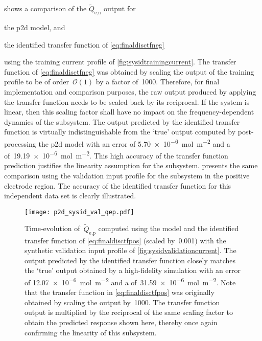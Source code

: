  shows a comparison of the $\widetilde{Q}_{\text{e,n}}$
output for
\begin{enumerate*}[label=\emph{\alph*})]
    \item the \gls{p2d} model, and
    \item the identified transfer function of \cref{eq:finaldisctfneg}
\end{enumerate*}
using  the  training  current  profile  of \cref{fig:sysidtrainingcurrent}.  The
transfer function of \cref{eq:finaldisctfneg} was obtained by scaling the output
of the  training profile to  be of order~$\mathcal{O}(1)$  by a factor  of~1000.
Therefore,  for final  implementation and  comparison purposes,  the raw  output
produced  by applying  the transfer  function  needs to  be scaled  back by  its
reciprocal. If  the system  is linear,  then this scaling  factor shall  have no
impact  on  the  frequency-dependent  dynamics  of  the  subsystem.  The  output
predicted  by the  identified transfer  function is  virtually indistinguishable
from  the `true'  output computed  by post-processing  the \gls{p2d}  model with
an    error   of  \SI{5.70e-6}{\mole\per\meter\squared}  and  a
 of~\SI{19.19e-6}{\mole\per\meter\squared}.  This high accuracy
of the transfer  function prediction justifies the linearity  assumption for the
subsystem.    presents  the  same  comparison  using  the
validation input profile for the subsystem in the positive electrode region. The
accuracy of  the identified transfer function  for this independent data  set is
clearly illustrated.

\begin{figure}[!htbp]
    \centering
    \texttt{[image: p2d\_sysid\_val\_qep.pdf]}
    \caption[$\widetilde{Q}_{\text{e,p}}(t)$ outputs from  and
    identified transfer function for training profile]{%
        Time-evolution of~$\widetilde{Q}_{\text{e,p}}$ computed using the
         model  and the identified transfer function
        of \cref{eq:finaldisctfpos} (scaled by~0.001) with the synthetic
        validation input profile of \cref{fig:sysidvalidationcurrent}. The output
        predicted by the identified transfer function closely matches the `true'
        output obtained by a high-fidelity  simulation with an
         error of \SI{12.07e-6}{\mole\per\meter\squared} and a
         of~\SI{31.59e-6}{\mole\per\meter\squared}. Note that the
        transfer function in \cref{eq:finaldisctfpos} was originally obtained by
        scaling the output by~1000. The transfer function output is
        multiplied by the reciprocal of the same scaling factor to obtain the
        predicted response shown here, thereby once again confirming the
        linearity of this subsystem.
    }%
    \label{fig:tfpredQepval}
\end{figure}

